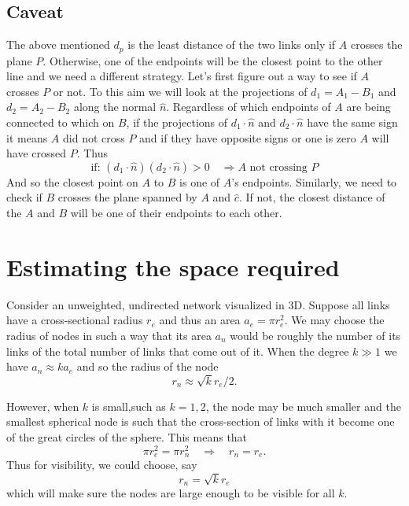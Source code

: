 \documentclass[nofootinbib,preprint,floatfix,titlepage,superscriptaddress]{revtex4} %
\begin{document}
\subsection{Caveat}
The above mentioned $d_p$ is the least distance of the two links only if $A$ crosses the plane $P$. Otherwise, one of the endpoints will be the closest point to the other line and we need a different strategy. Let's first figure out a way to see if $A$ crosses $P$ or not. To this aim we will look at the projections of $d_1= A_1-B_1$ and $d_2 = A_2 - B_2$ along the normal $\hat{n} $. Regardless of which endpoints of $A$ are being connected to which on $B$, if the projections of $d_1\cdot \hat{n}$ and $d_2\cdot \hat{n} $ have the same sign it means $A$ did not cross $P$ and if they have opposite signs or one is zero $A$ will have crossed $P$. Thus  
\[\mbox{if: } (d_1\cdot \hat{n})(d_2\cdot \hat{n}) >0 \quad \Rightarrow  A\mbox{ not crossing }P\]
And so the closest point on $A$ to $B$ is one of $A$'s endpoints. Similarly, we need to check if $B$ crosses the plane spanned by $A$ and $\hat{c}$. If not, the closest distance of the $A$ and $B$ will be one of their endpoints to each other. 



\section{Estimating the space required}
Consider an unweighted, undirected network visualized in 3D.  
Suppose all links have a cross-sectional radius $ r_e$ and thus an area $a_e = \pi r_e^2$. We may choose the radius of nodes in such a way that its area $a_n$ would be roughly the number of its links  of the total number of links that come out of it. When the degree $k\gg 1$ we have $a_n \approx k a_e$ and so the radius of the node $$r_n \approx \sqrt{k}r_e/2.$$ 

However, when $k$ is small,such as $k =1,2$, the node may be much smaller and the smallest spherical node is such that the cross-section of links with it become one of the great circles of the sphere. This means that 
$$ \pi r_e^2 = \pi r_n^2  \quad \Rightarrow \quad  r_n = r_e.$$
Thus for visibility, we could choose, say 
$$r_n = \sqrt{k} r_e$$
which will make sure the nodes are large enough to be visible for all $k$. 
\end{document}
